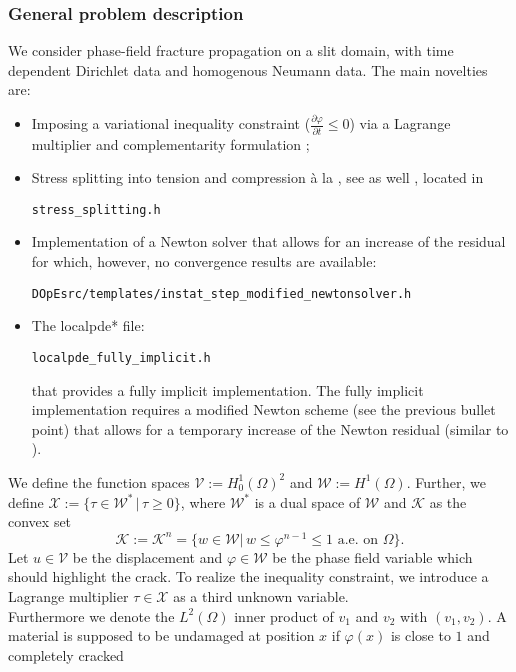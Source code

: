 \subsubsection{General problem description}
We consider phase-field fracture propagation on a slit domain, with time dependent 
Dirichlet data and homogenous Neumann data.
The main novelties are:
\begin{itemize}
\item Imposing a variational inequality constraint ($\frac{\partial \varphi}{\partial t} \leq 0$)
via a Lagrange multiplier and complementarity formulation ;
\item Stress splitting into tension and compression \`a
la \cite{MieWelHof10a}, see as well \cite{AmorMarigoMaurini2009}, located 
in 
\begin{verbatim}
stress_splitting.h
\end{verbatim}
\item Implementation of a Newton solver that 
allows for an increase of the residual for which, however,
no convergence results are available:
\begin{verbatim}
DOpEsrc/templates/instat_step_modified_newtonsolver.h
\end{verbatim}
\item The localpde* file:
\begin{verbatim}
localpde_fully_implicit.h
\end{verbatim}
that provides a fully implicit implementation.
The fully implicit implementation requires a modified Newton scheme (see the
previous bullet point) that 
allows for a temporary increase of the Newton residual (similar to \cite{Wi17_pff_error_oriented_Newton}).
\end{itemize}
We define the function spaces $\mathcal{V}:= H_0^1(\Omega)^2$ and
$\mathcal{W}:=  H^1(\Omega)$. 
Further, we define $\mathcal{X}:=\{\tau \in \mathcal{W}^*\, \vert\, \tau \geq 0\}$, 
where $\mathcal{W}^*$ is a dual space of $\mathcal{W}$ and $\mathcal{K}$ as the convex set
\[
\mathcal{K}:= \mathcal{K}^n = \{w\in \mathcal{W} |\, w\leq \varphi^{n-1} \leq 1 \text{ a.e. on }
\Omega\}.
\] 
Let $u \in \mathcal{V}$ be the displacement and $\varphi \in \mathcal{W}$ be the phase field variable which should highlight the crack.
To realize the inequality constraint, we introduce a Lagrange multiplier $\tau \in \mathcal{X}$ as a third unknown variable. \\
Furthermore we denote the $L^2(\Omega)$ inner product of $v_1$ and $v_2$ with $(v_1,v_2)$.
A material is supposed to be undamaged at position $x$ if $\varphi(x)$ is close to $1$ and completely cracked
